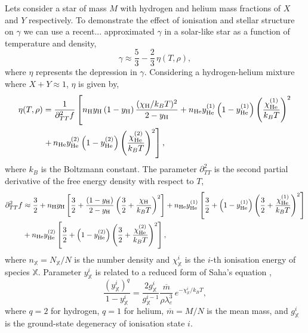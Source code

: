 Lets consider a star of mass \(M\) with hydrogen and helium mass fractions of \(X\) and \(Y\) respectively. To demonstrate the effect of ionisation and stellar structure on \(\gamma\) we can use a recent... \citet{Houdayer.Reese.ea2021} approximated \(\gamma\) in a solar-like star as a function of temperature and density,
%
\begin{equation}
    \gamma \approx \frac{5}{3} - \frac{2}{3} \, \eta(T, \rho), \label{eq:gamma1}
\end{equation}
%
where \(\eta\) represents the depression in \(\gamma\). Considering a hydrogen-helium mixture where \(X + Y \approx 1\), \(\eta\) is given by,
%
\begin{equation}
    \begin{split}
        \eta(T, \rho) &= \frac{1}{\partial_{TT}^2 f} \left[n_{{\mathrm{H}}} y_{{\mathrm{H}}} \, (1 - y_{{\mathrm{H}}}) \, \frac{(\chi_{{\mathrm{H}}} / k_B T)^2}{2 - y_{{\mathrm{H}}}}
        + n_{{\mathrm{He}}} y_{{\mathrm{He}}}^{(1)} \left(1 - y_{{\mathrm{He}}}^{(1)}\right) \left(\frac{\chi_{{\mathrm{He}}}^{(1)}}{k_B T}\right)^2 
        \right. \\ &\left.
        + \, n_{{\mathrm{He}}} y_{{\mathrm{He}}}^{(2)} \left(1 - y_{{\mathrm{He}}}^{(2)}\right) \left(\frac{\chi_{{\mathrm{He}}}^{(2)}}{k_B T}\right)^2\right],
    \end{split}
\end{equation}
%
where \(k_B\) is the Boltzmann constant. The parameter \(\partial_{TT}^2\) is the second partial derivative of the free energy density with respect to \(T\),
%
\begin{equation}
    \begin{split}
        \partial_{TT}^2 f &\approx \frac{3}{2} + n_\hydrogen y_\hydrogen \left[ \frac{3}{2} + \frac{(1 - y_\hydrogen)}{2 - y_\hydrogen} \left(\frac{3}{2} + \frac{\chi_\hydrogen}{k_B T}\right)^2 \right] %
        + n_\helium y_\helium^{(1)} \left[ \frac{3}{2} + \left(1 - y_\helium^{(1)}\right) \left(\frac{3}{2} + \frac{\chi_\helium^{(1)}}{k_B T}\right)^2 \right] \\
        &+ n_\helium y_\helium^{(2)} \left[ \frac{3}{2} + \left(1 - y_\helium^{(2)}\right) \left(\frac{3}{2} + \frac{\chi_\helium^{(2)}}{k_B T}\right)^2 \right],
    \end{split}
\end{equation}
%
where \(n_\mathbb{X} = N_\mathbb{X} / N\) is the number density and \(\chi_\mathbb{X}^{i}\) is the \(i\)-th ionisation energy of species \(\mathbb{X}\). Parameter \(y_\mathbb{X}^i\) is related to a reduced form of Saha's equation \needcite,
%
\begin{equation}
    \frac{(y_\mathbb{X}^i)^q}{1 - y_\mathbb{X}^i} = \frac{2 g_\mathbb{X}^i}{g_\mathbb{X}^{i-1}} \frac{\overline{m}}{\rho \lambda_e^3} \, e^{- \chi_\mathbb{X}^i / k_B T},
\end{equation}
%
where \(q = 2\) for hydrogen, \(q = 1\) for helium, \(\overline{m} = M/N\) is the mean mass, and \(g_\mathbb{X}^i\) is the ground-state degeneracy of ionisation state \(i\). 

